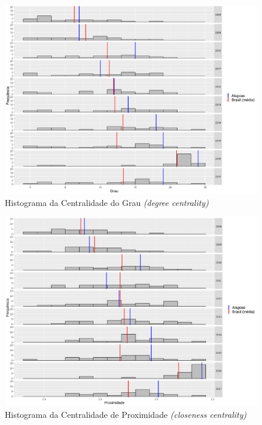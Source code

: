 \documentclass[12pt]{article}
\begin{document}
\begin{figure}[H]
\centering
\includegraphics[scale=0.6]{images/degree-hist.pdf}
\caption{Histograma da Centralidade do Grau \textit{(degree centrality)}}
\end{figure}

\begin{figure}[H]
\centering
\includegraphics[scale=0.6]{images/closeness-hist.pdf}
\caption{Histograma da Centralidade de Proximidade \textit{(closeness centrality)}}
\end{figure}
\end{document}
